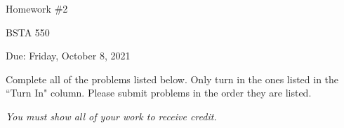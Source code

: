 \documentclass[12pt]{article}
\begin{document}
\begin{center}

Homework \#2

BSTA 550

Due: Friday, October 8, 2021

%
\bigskip



\end{center}


\bigskip

Complete all of the problems listed below. \newline 
Only turn in the ones listed in the ``Turn In" column. \newline
Please submit problems in the order they are listed.

\bigskip

\textit{You must show all of your work to receive credit.}  \newline 



\end{document}
